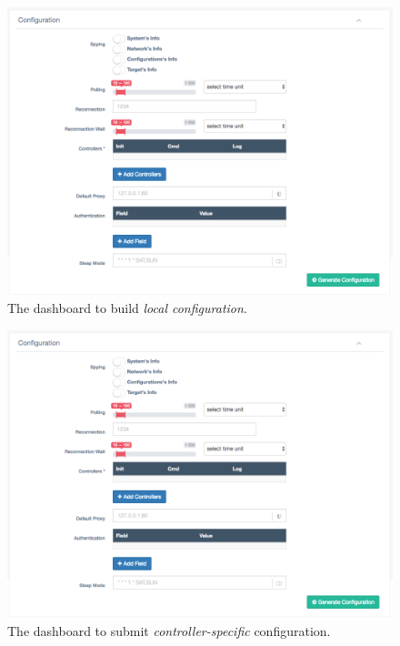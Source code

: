 \begin{figure}[h]
  \centering
  \includegraphics[scale=0.45]{./fig/configurationWUI.png}
  \caption{The dashboard to build \textit{local configuration}.}
    \label{fig:configuration-wui}
\end{figure}

\begin{figure}[h]
	\centering
	\includegraphics[scale=0.45]{./fig/configurationWUI.png}
	\caption{The dashboard to submit \textit{controller-specific} configuration.}
	\label{fig:initialization-wui}
\end{figure}
